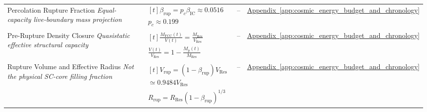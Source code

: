 \begin{longtable}{@{} p{4.5cm} p{6cm} c p{4cm} @{}}
{\raggedright Percolation Rupture Fraction \newline \textit{Equal-capacity live-boundary mass projection}\par} & {\raggedright $\begin{gathered}[t]\beta_{\mathrm{rup}}=p_c\beta_{\mathrm{IC}}\approx0.0516 \\ p_c\approx0.199\end{gathered}$\par} & -- & {\raggedright \hyperref[app:cosmic_energy_budget_and_chronology]{Appendix~\ref*{app:cosmic_energy_budget_and_chronology}}\par} \\

{\raggedright Pre-Rupture Density Closure \newline \textit{Quasistatic effective structural capacity}\par} & {\raggedright $\begin{gathered}[t]\frac{M_{\mathrm{FCC}}(t)}{V(t)}=\frac{M_{\mathrm{Res}}}{V_{\mathrm{Res}}} \\ \frac{V(t)}{V_{\mathrm{Res}}}=1-\frac{M_{\mathrm p}(t)}{M_{\mathrm{Res}}}\end{gathered}$\par} & -- & {\raggedright \hyperref[app:cosmic_energy_budget_and_chronology]{Appendix~\ref*{app:cosmic_energy_budget_and_chronology}}\par} \\

{\raggedright Rupture Volume and Effective Radius \newline \textit{Not the physical SC-core filling fraction}\par} & {\raggedright $\begin{gathered}[t]V_{\mathrm{rup}}=(1-\beta_{\mathrm{rup}})V_{\mathrm{Res}} \\ \simeq0.9484V_{\mathrm{Res}} \\ R_{\mathrm{rup}}=R_{\mathrm{Res}}(1-\beta_{\mathrm{rup}})^{1/3}\end{gathered}$\par} & -- & {\raggedright \hyperref[app:cosmic_energy_budget_and_chronology]{Appendix~\ref*{app:cosmic_energy_budget_and_chronology}}\par} \\


\end{longtable}
